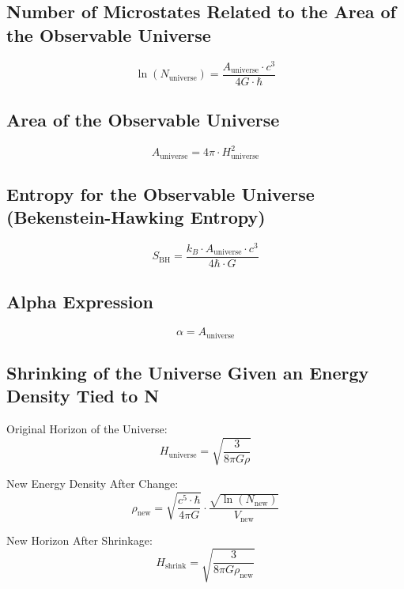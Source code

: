 \documentclass[a4paper, 11pt]{article}
\begin{document}
\subsection{Number of Microstates Related to the Area of the Observable Universe}
\begin{equation}
\ln(N_{\text{universe}}) = \frac{A_{\text{universe}} \cdot c^3}{4G \cdot \hbar}
\end{equation}

\subsection{Area of the Observable Universe}
\begin{equation}
A_{\text{universe}} = 4 \pi \cdot H_{\text{universe}}^2
\end{equation}

\subsection{Entropy for the Observable Universe (Bekenstein-Hawking Entropy)}
\begin{equation}
S_{\text{BH}} = \frac{k_B \cdot A_{\text{universe}} \cdot c^3}{4 \hbar \cdot G}
\end{equation}

\subsection{Alpha Expression}
\begin{equation}
\alpha = A_{\text{universe}}
\end{equation}

\subsection{Shrinking of the Universe Given an Energy Density Tied to N}

Original Horizon of the Universe:
\begin{equation}
H_{\text{universe}} = \sqrt{\frac{3}{8 \pi G \rho}}
\end{equation}

New Energy Density After Change:
\begin{equation}
\rho_{\text{new}} = \sqrt{\frac{c^5 \cdot \hbar}{4 \pi G}} \cdot \frac{\sqrt{\ln(N_{\text{new}})}}{V_{\text{new}}}
\end{equation}

New Horizon After Shrinkage:
\begin{equation}
H_{\text{shrink}} = \sqrt{\frac{3}{8 \pi G \rho_{\text{new}}}}
\end{equation}
\end{document}
